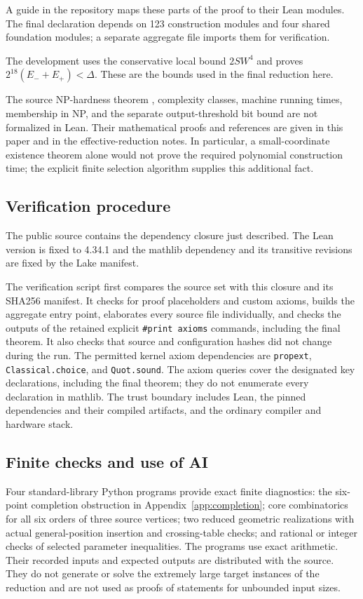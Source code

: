 A guide in the repository maps these parts of the proof to their Lean
modules. The final declaration depends on 123 construction modules and
four shared foundation modules; a separate aggregate file imports them
for verification.

The development uses the conservative local bound $2SW^4$ and proves
$2^{18}(E_-+E_+)<\Delta$. These are the bounds used in the final
reduction here.

The source NP-hardness theorem \cite{Figueiredo2023}, complexity classes,
machine running times, membership in NP, and the separate output-threshold
bit bound are not formalized in Lean. Their mathematical proofs and
references are given in this paper and in the effective-reduction notes.
In particular, a small-coordinate existence theorem alone would not
prove the required polynomial construction time; the explicit finite
selection algorithm supplies this additional fact.

\subsection{Verification procedure}

The public source contains the dependency closure just described.
The Lean version is fixed to 4.34.1 and the mathlib dependency and its
transitive revisions are fixed by the Lake manifest.

The verification script first compares the source set with this closure
and its SHA256 manifest. It checks for proof placeholders and custom
axioms, builds the aggregate entry point, elaborates every source file
individually, and checks the outputs of the retained explicit
\texttt{\#print axioms} commands, including the final theorem. It also
checks that source and configuration hashes did not change during the
run. The permitted kernel axiom dependencies are
\texttt{propext}, \texttt{Classical.choice}, and \texttt{Quot.sound}.
The axiom queries cover the designated key declarations, including the
final theorem; they do not enumerate every declaration in mathlib.
The trust boundary includes Lean, the pinned dependencies and their
compiled artifacts, and the ordinary compiler and hardware stack.

\subsection{Finite checks and use of AI}

Four standard-library Python programs provide exact finite diagnostics:
the six-point completion obstruction in Appendix~\ref{app:completion};
core combinatorics for all six orders of three source vertices; two
reduced geometric realizations with actual general-position insertion
and crossing-table checks; and rational or integer checks of selected
parameter inequalities. The programs use exact arithmetic. Their
recorded inputs and expected outputs are distributed with the source.
They do not generate or solve the extremely large target instances of
the reduction and are not used as proofs of statements for unbounded
input sizes.

